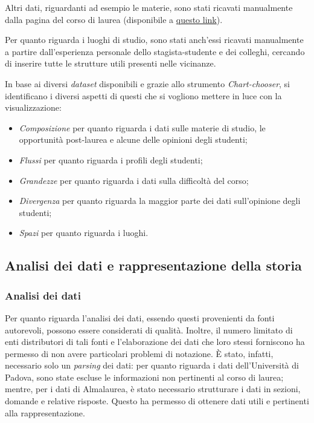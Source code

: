 Altri dati, riguardanti ad esempio le materie, sono stati ricavati manualmente dalla pagina del corso di laurea (disponibile a \href{https://www.didattica.unipd.it/off/2023/LT/SC/SC1167}{questo link}).

Per quanto riguarda i luoghi di studio, sono stati anch'essi ricavati manualmente a partire dall'esperienza personale dello stagista-studente e dei colleghi, cercando di inserire tutte le strutture utili presenti nelle vicinanze.

\bigskip
\noindent In base ai diversi \emph{dataset} disponibili e grazie allo strumento \emph{Chart-chooser}, si identificano i diversi aspetti di questi che si vogliono mettere in luce con la visualizzazione:
\begin{itemize}
    \item \emph{Composizione} per quanto riguarda i dati sulle materie di studio, le opportunità post-laurea e alcune delle opinioni degli studenti;
    \item \emph{Flussi} per quanto riguarda i profili degli studenti;
    \item \emph{Grandezze} per quanto riguarda i dati sulla difficoltà del corso;
    \item \emph{Divergenza} per quanto riguarda la maggior parte dei dati sull'opinione degli studenti;
    \item \emph{Spazi} per quanto riguarda i luoghi.
\end{itemize}

\subsection{Analisi dei dati e rappresentazione della storia}
\subsubsection{Analisi dei dati}
Per quanto riguarda l'analisi dei dati, essendo questi provenienti da fonti autorevoli, possono essere considerati di qualità. Inoltre, il numero limitato di enti distributori di tali fonti e l'elaborazione 
dei dati che loro stessi forniscono ha permesso di non avere particolari problemi di notazione. 
È stato, infatti, necessario solo un \emph{parsing} dei dati: per quanto riguarda i dati dell'Università di Padova, sono state escluse le informazioni non pertinenti al corso di laurea;
mentre, per i dati di Almalaurea, è stato necessario strutturare i dati in sezioni, domande e relative risposte. 
Questo ha permesso di ottenere dati utili e pertinenti alla rappresentazione.

